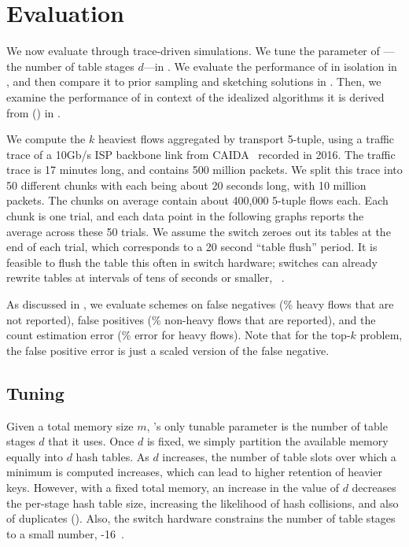 \section{Evaluation}
\label{sec:evaluation}

We now evaluate \TheSystem through trace-driven simulations. We tune the
parameter of \TheSystem---the number of table stages $d$---in
. We evaluate the performance of \TheSystem in isolation
in , and then compare it to prior sampling and
sketching solutions in . Then, we examine the
performance of \TheSystem in context of the idealized algorithms it is derived from
() in .

 We compute the $k$ heaviest flows aggregated
by transport 5-tuple, using a traffic trace of a 10Gb/s ISP backbone link from
CAIDA~\cite{caida} recorded in 2016. The traffic trace is 17 minutes long, and
contains 500 million packets. We split this trace into 50 different chunks with
each being about 20 seconds long, with 10 million packets. The chunks on average
contain about 400,000 5-tuple flows each. Each chunk is one trial, and each data
point in the following graphs reports the average across these 50 trials. We
assume the switch zeroes out its tables at the end of each trial, which
corresponds to a 20 second ``table flush'' period. It is feasible to flush the
table this often in switch hardware; switches can already rewrite tables at
intervals of tens of seconds or smaller, \eg~\cite{bgp-neighbor-timer,
  netflow-timer, li2016flowradar}.

 As discussed in , we evaluate schemes on
false negatives (\% heavy flows that are not reported), false positives (\%
non-heavy flows that are reported), and the count estimation error (\% error for
heavy flows). Note that for the top-$k$ problem, the false positive error is
just a scaled version of the false negative.

\subsection{Tuning \TheSystem}
\label{subsec:sensitivity}

Given a total memory size $m$, \TheSystem's only tunable parameter is the number of
table stages $d$ that it uses. Once $d$ is fixed, we simply partition the
available memory equally into $d$ hash tables. As $d$ increases, the number of
table slots over which a minimum is computed increases, which can lead to higher
retention of heavier keys. However, with a fixed total memory, an increase in
the value of $d$ decreases the per-stage hash table size, increasing the
likelihood of hash collisions, and also of duplicates
(). Also, the switch hardware constrains the number
of table stages to a small number, -16~\cite{intel-fm6000, RMT}.

